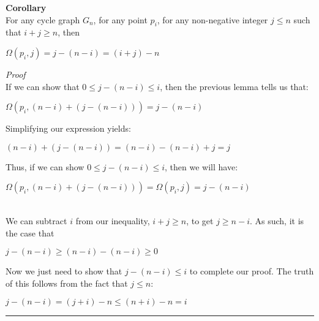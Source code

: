 \documentclass[a4paper,12pt]{article}
\begin{document}
\begin{tcolorbox}
\textbf{Corollary}\\
For any cycle graph $G_n$, for any point $p_i$, for any non-negative integer $j \leq n$ such that $i + j \geq n$, then
\begin{center}
$\Omega(p_i, j) = j - (n - i) = (i + j) - n$
\end{center}
\end{tcolorbox}
\noindent
\textit{Proof}\\
If we can show that $0 \leq j - (n - i) \leq i$, then the previous lemma tells us that:
\begin{center}
$\Omega(p_i, (n - i) + (j - (n - i))) = j - (n - i)$
\end{center}
Simplifying our expression yields:
\begin{center}
$(n - i) + (j - (n - i)) = (n - i) - (n - i) + j = j$
\end{center}
Thus, if we can show $0 \leq j - (n - i) \leq i$, then we will have:
\begin{center}
$\Omega(p_i, (n - i) + (j - (n - i))) = \Omega(p_i, j) = j - (n - i)$
\end{center}
\noindent
\\
We can subtract $i$ from our inequality, $i + j \geq n$, to get $j \geq n - i$.
As such, it is the case that
\begin{center}
$j - (n - i) \geq (n - i) - (n - i) \geq 0$
\end{center}
Now we just need to show that $j - (n - i) \leq i$ to complete our proof. The truth of this follows from the fact that $j \leq n$:
\begin{center}
$j - (n - i) = (j + i) - n \leq (n + i) - n = i$
\end{center}

\begin{center}
\noindent\rule{8cm}{0.4pt}
\end{center}
\end{document}
